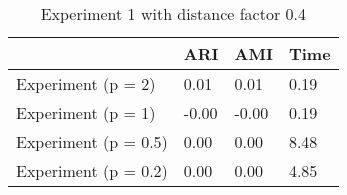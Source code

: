 \begin{table}
\centering
\caption{Experiment 1 with distance factor 0.4}
\begin{tabular}{llll}
\toprule
{} &    ARI &    AMI &  Time \\
\midrule
Experiment (p = 2)   &   0.01 &   0.01 &  0.19 \\
Experiment (p = 1)   &  -0.00 &  -0.00 &  0.19 \\
Experiment (p = 0.5) &   0.00 &   0.00 &  8.48 \\
Experiment (p = 0.2) &   0.00 &   0.00 &  4.85 \\
\bottomrule
\end{tabular}
\end{table}
